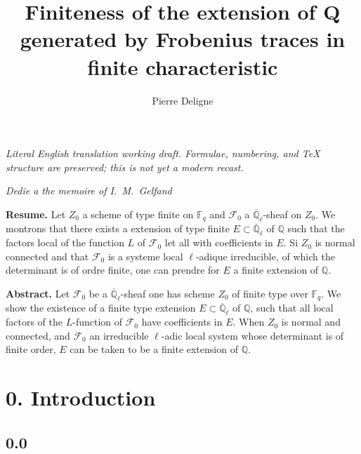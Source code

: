 \documentclass[11pt,a4paper]{article}
\theoremstyle{plain}
\theoremstyle{definition}
\begin{document}
\begin{center}\small\emph{Literal English translation working draft. Formulae, numbering, and TeX structure are preserved; this is not yet a modern recast.}\end{center}
\vspace{0.5em}


\title{Finiteness of the extension of Q generated by Frobenius traces in finite characteristic}
\author{Pierre Deligne}
\date{}
\maketitle

\begin{center}
\textit{Dedie a the memoire of I.~M.~Gelfand}
\end{center}

\noindent\textbf{Resume.} Let $Z_0$ a scheme of type finite on $\mathbb{F}_q$ and $\mathcal{F}_0$ a $\overline{\mathbb{Q}}_\ell$-sheaf on $Z_0$. We montrons that there exists a extension of type finite $E \subset \overline{\mathbb{Q}}_\ell$ of $\mathbb{Q}$ such that the factors local of the function $L$ of $\mathcal{F}_0$ let all with coefficients in $E$. Si $Z_0$ is normal connected and that $\mathcal{F}_0$ is a systeme local $\ell$-adique irreducible, of which the determinant is of ordre finite, one can prendre for $E$ a finite extension of $\mathbb{Q}$.

\medskip
\noindent\textbf{Abstract.} Let $\mathcal{F}_0$ be a $\overline{\mathbb{Q}}_\ell$-sheaf one has scheme $Z_0$ of finite type over $\mathbb{F}_q$. We show the existence of a finite type extension $E \subset \overline{\mathbb{Q}}_\ell$ of $\mathbb{Q}$, such that all local factors of the $L$-function of $\mathcal{F}_0$ have coefficients in $E$. When $Z_0$ is normal and connected, and $\mathcal{F}_0$ an irreducible $\ell$-adic local system whose determinant is of finite order, $E$ can be taken to be a finite extension of $\mathbb{Q}$.

\tableofcontents

\section*{0. Introduction}

\subsection*{0.0}
\end{document}
